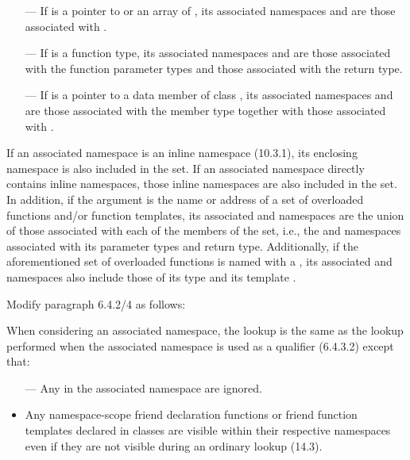 \begin{extract*}
\begin{std.txt}
\begin{itemize}
  \item[---] If  is a pointer to  or an array
  of , its associated namespaces
  and   are those associated
  with . 

  \item[---] If  is a function type, its associated
  namespaces and   are those
  associated with the function parameter types and those associated
  with the return type.

  \item[---] If  is a pointer to a data member of
  class , its associated namespaces
  and   are those associated with the
  member type together with those associated with .
  \end{itemize}

  If an associated namespace is an inline namespace (10.3.1), its
  enclosing namespace is also included in the set.  If an associated
  namespace directly contains inline namespaces, those inline
  namespaces are also included in the set.  In addition, if the
  argument is the name or address of a set of overloaded functions
  and/or function templates, its
  associated   and namespaces are the
  union of those associated with each of the members of the set, i.e.,
  the   and namespaces associated
  with its parameter types and return type.  Additionally, if the
  aforementioned set of overloaded functions is named with
  a , its
  associated   and namespaces also
  include those of its type  and its
  template .
\end{std.txt}

\noindent
Modify paragraph 6.4.2/4 as follows:
\begin{std.txt}
  \resetalinea[3]
  \alinea
  When considering an associated namespace, the lookup is the same as
  the lookup performed when the associated namespace is used as a
  qualifier (6.4.3.2) except that:
  \begin{itemize}
    \item[---] Any  in the associated
  namespace are ignored.

     \item Any namespace-scope friend declaration functions or friend
  function templates declared in 
  classes  are visible within
  their respective namespaces even if they are not visible during an
  ordinary lookup (14.3).


\end{itemize}
\end{std.txt}
\end{extract*}
